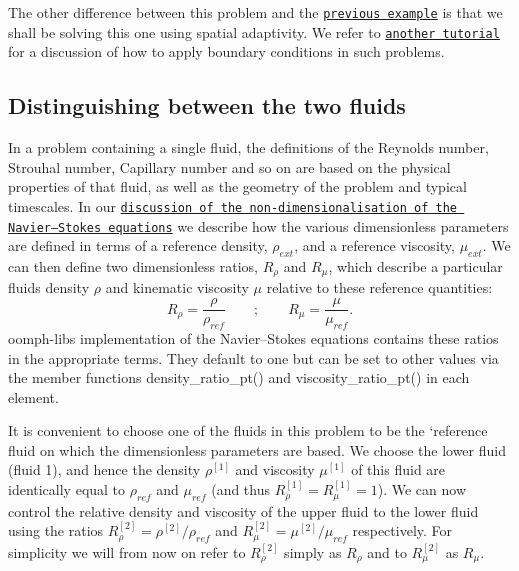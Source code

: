 The other difference between this problem and the \href{../../single_layer_free_surface/html/index.html}{\tt previous example} is that we shall be solving this one using spatial adaptivity. We refer to \href{../../../poisson/two_d_poisson_flux_bc_adapt/html/index.html}{\tt another tutorial} for a discussion of how to apply boundary conditions in such problems.\hypertarget{index_dens_visc_ratios}{}\subsection{Distinguishing between the two fluids}\label{index_dens_visc_ratios}
In a problem containing a single fluid, the definitions of the Reynolds number, Strouhal number, Capillary number and so on are based on the physical properties of that fluid, as well as the geometry of the problem and typical timescales. In our \href{../../driven_cavity/html/index.html}{\tt discussion of the non-\/dimensionalisation of the Navier--Stokes equations} we describe how the various dimensionless parameters are defined in terms of a reference density, $ \rho_{ext} $, and a reference viscosity, $ \mu_{ext} $. We can then define two dimensionless ratios, $ R_\rho $ and $ R_\mu $, which describe a particular fluid\textquotesingle{}s density $ \rho $ and kinematic viscosity $ \mu $ relative to these reference quantities\+: \[ R_\rho = \frac{\rho}{\rho_{ref}} \qquad ; \qquad R_\mu = \frac{\mu}{\mu_{ref}}. \] {\ttfamily oomph-\/lib\textquotesingle{}s} implementation of the Navier--Stokes equations contains these ratios in the appropriate terms. They default to one but can be set to other values via the member functions {\ttfamily density\+\_\+ratio\+\_\+pt()} and {\ttfamily viscosity\+\_\+ratio\+\_\+pt()} in each element.

It is convenient to choose one of the fluids in this problem to be the `reference fluid\textquotesingle{} on which the dimensionless parameters are based. We choose the lower fluid (fluid 1), and hence the density $ \rho^{[1]} $ and viscosity $ \mu^{[1]} $ of this fluid are identically equal to $ \rho_{ref} $ and $ \mu_{ref} $ (and thus $ R_\rho^{[1]} = R_\mu^{[1]} = 1 $). We can now control the relative density and viscosity of the upper fluid to the lower fluid using the ratios $ R_\rho^{[2]} = \rho^{[2]}/\rho_{ref} $ and $ R_\mu^{[2]} = \mu^{[2]}/\mu_{ref} $ respectively. For simplicity we will from now on refer to $ R_\rho^{[2]} $ simply as $ R_\rho $ and to $ R_\mu^{[2]} $ as $ R_\mu $.



